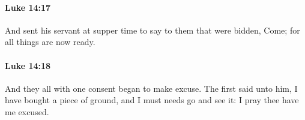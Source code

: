 		\paragraph{Luke 14:17} %
			\label{LUKE-14-17}

			And sent his servant at supper time to say to them that were bidden, Come; for all things are now ready.

			\begin{framed}
			\scriptsize
				\begin{compactdesc}
					\item[SBLG] 
				\end{compactdesc}
			\end{framed}

		\paragraph{Luke 14:18} %
			\label{LUKE-14-18}

			And they all with one consent began to make excuse. The first said unto him, I have bought a piece of ground, and I must needs go and see it: I pray thee have me excused.

